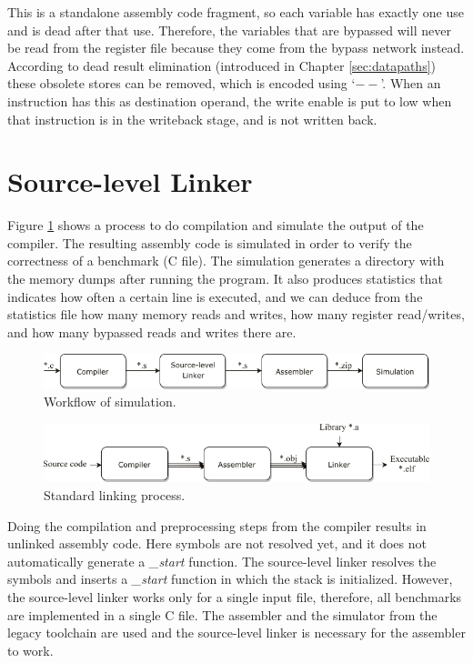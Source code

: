 This is a standalone assembly code fragment, so each variable has exactly one use and is dead after that use. Therefore, the variables that are bypassed will never be read from the register file because they come from the bypass network instead. According to dead result elimination (introduced in Chapter \ref{sec:datapaths}) these obsolete stores can be removed, which is encoded using `$--$'. When an instruction has this as destination operand, the write enable is put to low when that instruction is in the writeback stage, and is not written back. 


\section{Source-level Linker}
Figure \ref{fig:linker_A} shows a process to do compilation and simulate the output of the compiler. The resulting assembly code is simulated in order to verify the correctness of a benchmark (C file). The simulation generates a directory with the memory dumps after running the program. It also produces statistics that indicates how often a certain line is executed, and we can deduce from the statistics file how many memory reads and writes, how many register read/writes, and how many bypassed reads and writes there are.

\begin{figure}[H]
\centering
\includegraphics[width=.95\textwidth]{figures/linker_illustration1}
\caption{Workflow of simulation.}
\label{fig:linker_A}
\end{figure}
\begin{figure}[b]
\centering
\includegraphics[width=.9\textwidth]{figures/linker_illustration2}
\caption{Standard linking process.}
\label{fig:linker_B}
\end{figure}

Doing the compilation and preprocessing steps from the compiler results in unlinked assembly code. Here symbols are not resolved yet, and it does not automatically generate a \emph{\_start} function. The source-level linker resolves the symbols and inserts a \emph{\_start} function in which the stack is initialized. However, the source-level linker works only for a single input file, therefore, all benchmarks are implemented in a single C file. The assembler and the simulator from the legacy toolchain are used and the source-level linker is necessary for the assembler to work. \\

